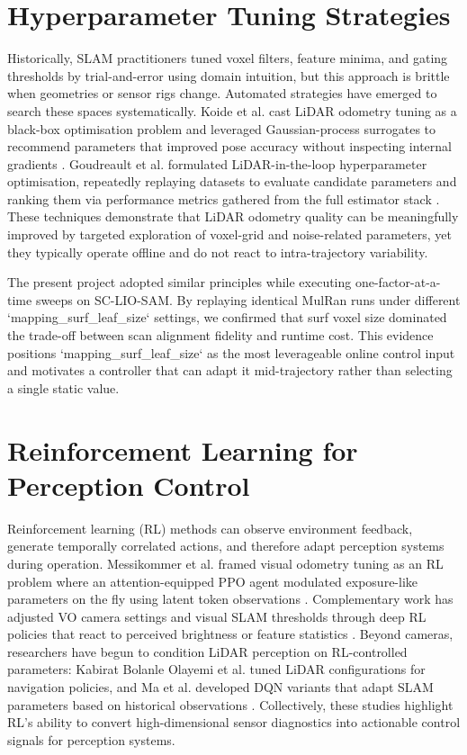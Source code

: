 \section{Hyperparameter Tuning Strategies}
Historically, SLAM practitioners tuned voxel filters, feature minima, and gating thresholds by trial-and-error using domain intuition, but this approach is brittle when geometries or sensor rigs change. Automated strategies have emerged to search these spaces systematically. Koide et al. cast LiDAR odometry tuning as a black-box optimisation problem and leveraged Gaussian-process surrogates to recommend parameters that improved pose accuracy without inspecting internal gradients \cite{koide_2021_adaptive}. Goudreault et al. formulated LiDAR-in-the-loop hyperparameter optimisation, repeatedly replaying datasets to evaluate candidate parameters and ranking them via performance metrics gathered from the full estimator stack \cite{goudreault_2023_lidarintheloop}. These techniques demonstrate that LiDAR odometry quality can be meaningfully improved by targeted exploration of voxel-grid and noise-related parameters, yet they typically operate offline and do not react to intra-trajectory variability.

The present project adopted similar principles while executing one-factor-at-a-time sweeps on SC-LIO-SAM. By replaying identical MulRan runs under different `mapping\_surf\_leaf\_size` settings, we confirmed that surf voxel size dominated the trade-off between scan alignment fidelity and runtime cost. This evidence positions `mapping\_surf\_leaf\_size` as the most leverageable online control input and motivates a controller that can adapt it mid-trajectory rather than selecting a single static value.

\section{Reinforcement Learning for Perception Control}
Reinforcement learning (RL) methods can observe environment feedback, generate temporally correlated actions, and therefore adapt perception systems during operation. Messikommer et al. framed visual odometry tuning as an RL problem where an attention-equipped PPO agent modulated exposure-like parameters on the fly using latent token observations \cite{nicomessikommer_2024_reinforcement}. Complementary work has adjusted VO camera settings and visual SLAM thresholds through deep RL policies that react to perceived brightness or feature statistics \cite{zhang_2024_efficient, li_2025_uampc}. Beyond cameras, researchers have begun to condition LiDAR perception on RL-controlled parameters: Kabirat Bolanle Olayemi et al. tuned LiDAR configurations for navigation policies, and Ma et al. developed DQN variants that adapt SLAM parameters based on historical observations \cite{kabiratbolanleolayemi_2023_the, ma_2025_mambadqn}. Collectively, these studies highlight RL’s ability to convert high-dimensional sensor diagnostics into actionable control signals for perception systems.

